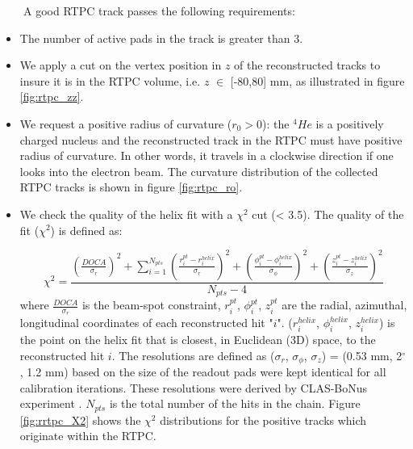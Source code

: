 ~~~~A good RTPC track passes the following requirements:
\begin{itemize}
\item The number of active pads in the track is greater than 3. 

\item We apply a cut on the vertex position in $z$ of the reconstructed tracks 
   to insure it is in the RTPC volume, i.e. $z$ $\in$ [-80,80] mm, as 
   illustrated in figure \ref{fig:rtpc_zz}.  

\item We request a positive radius of curvature ($r_{0}>0$): the $^4He$ is a positively 
   charged nucleus and the reconstructed track in the RTPC must have positive 
   radius of curvature. In other words, it travels in a clockwise direction if 
   one looks into the electron beam. The curvature distribution of the 
   collected RTPC tracks is shown in figure \ref{fig:rtpc_ro}.

\item We check the quality of the helix fit with a $\chi^{2}$ cut (< 3.5). The 
   quality of the fit ($\chi^{2}$) is defined as:

\begin{equation}
   \chi^{2} = \frac{\displaystyle \left(\frac{DOCA}{\sigma_r}\right)^2 
       + \sum_{i = 1}^{ N_{pts}} \left(\frac{r^{pt}_{i} 
      - r^{helix}_{i} }{\sigma_{r}}\right)^{2}  + \left( \frac{\phi^{pt}_{i} - 
      \phi^{helix}_{i} }{\sigma_{\phi}}\right)^{2} + \left( \frac{z^{pt}_{i} - 
   z^{helix}_{i} }{\sigma_{z} } \right)^{2}}{N_{pts} - 4}
\end{equation}
where $\frac{DOCA}{\sigma_r}$ is the beam-spot constraint, $r^{pt}_{i}$, 
$\phi^{pt}_{i}$, $z^{pt}_{i}$ are the radial, azimuthal, longitudinal 
coordinates of each reconstructed hit "$i$". ($r^{helix}_{i}$,
$\phi^{helix}_{i}$, $z^{helix}_{i}$) is the point on the helix fit that is 
closest, in Euclidean (3D) space, to the reconstructed hit $i$. The resolutions 
are defined as ($\sigma_{r}$, $\sigma_{\phi}$, $\sigma_{z}$) = (0.53 mm, 
2$^{\circ}$, 1.2 mm) based on the size
of the readout pads were kept identical for all calibration iterations. These 
resolutions were derived by CLAS-BoNus experiment \cite{BONUS}. $N_{pts}$ is 
the total number of the hits in the chain.  Figure \ref{fig:rrtpc_X2} shows the 
$\chi^{2}$ distributions for the positive tracks which originate within the 
RTPC.


\end{itemize}
